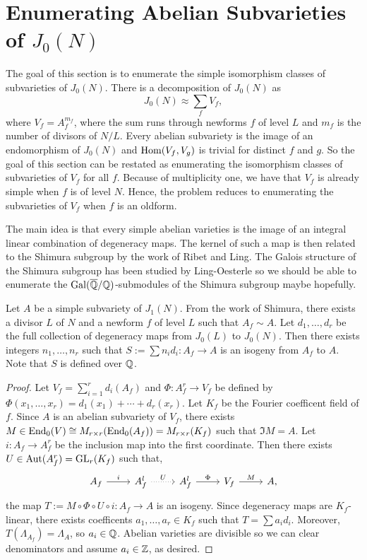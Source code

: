 \documentclass{article}
\begin{document}
\section{Enumerating Abelian Subvarieties of $J_0(N)$}

The goal of this section is to enumerate the simple isomorphism classes of
subvarieties of $J_0(N)$. There is a decomposition of $J_0(N)$ as 
\[
    J_0(N) \approx 
    \sum_{f} V_f,
\]
where $V_f=A_f ^{m_f}$, where the sum runs through newforms $f$ of level $L$
and $m_f$ is the number of divisors of $N/L$. Every abelian subvariety is the
image of an endomorphism of $J_0(N)$ and $\operatorname{Hom}(V_f, V_g)$ is trivial for
distinct $f$ and $g$. So the goal of this section can be restated as
enumerating the isomorphism classes of subvarieties of $V_f$ for all $f$.
Because of multiplicity one, we have that $V_f$ is already simple when $f$ is
of level $N$. Hence, the problem reduces to enumerating the subvarieties of
$V_f$ when $f$ is an oldform.

The main idea is that every simple abelian varieties is the image of an
integral linear combination of degeneracy maps. The kernel of such a map is
then related to the Shimura subgroup by the work of Ribet and Ling. The Galois
structure of the Shimura subgroup has been studied by Ling-Oesterle so we
should be able to enumerate the $\operatorname{Gal}(\overline{\mathbb{Q}}/\mathbb{Q})$-submodules of the Shimura
subgroup maybe hopefully.

\begin{proposition}
    Let $A$ be a simple subvariety of $J_1(N)$. From the work of Shimura,
    there exists a divisor $L$ of $N$ and a newform $f$ of level $L$ such that
    $A_f \sim A$. Let $d_1,\ldots,d_r$ be the full collection of degeneracy
    maps from $J_0(L)$ to $J_0(N)$. Then there exists integers $n_1,\ldots,n_r$
    such that $S:=\sum n_i d_i: A_f\to A$ is an isogeny from $A_f$ to $A$. Note
    that $S$ is defined over $\mathbb{Q}$.
\end{proposition}
\begin{proof}
    Let $V_f=\sum_{i=1} ^r d_i(A_f)$ and $\Phi:A_f ^r \to V_f$ be defined by
    $\Phi(x_1,\ldots,x_r) = d_1(x_1)+\cdots+d_r(x_r)$. Let $K_f$ be the Fourier
    coefficent field of $f$. Since $A$ is an abelian subvariety of $V_f$, there
    exists $M\in \operatorname{End}_0(V)\cong M_{r\times r} (\operatorname{End}_0(A_f)) = M_{r\times r}
    (K_f)$ such that $\Im M = A$. Let $i:A_f\to A_f ^r$ be the inclusion map
    into the first coordinate. Then there exists $U\in \operatorname{Aut}(A_f
    ^r)=\operatorname{GL}_r (K_f)$ such that,
    \[
        \begin{tikzcd}
            A_f \arrow[r,"i"] &
            A_f ^l \arrow[r, dotted, "U"] &
            A_f ^l \arrow[r, "\Phi"] &
            V_f \arrow[r, "M"] &
            A,
        \end{tikzcd}
    \]
    the map $T:=M \circ \Phi \circ U\circ i:A_f\to A$ is an isogeny. Since
    degeneracy maps are $K_f$-linear, there exists coefficents
    $a_1,\ldots,a_r\in K_f$ such that $T = \sum a_i d_i$. Moreover,
    $T(\Lambda_{A_f})=\Lambda_A$, so $a_i\in \mathbb{Q}$. Abelian varieties are
    divisible so we can clear denominators and assume $a_i\in \mathbb{Z}$, as desired.
\end{proof}



\begin{proposition}
    
\end{proposition}
    
\end{document}
